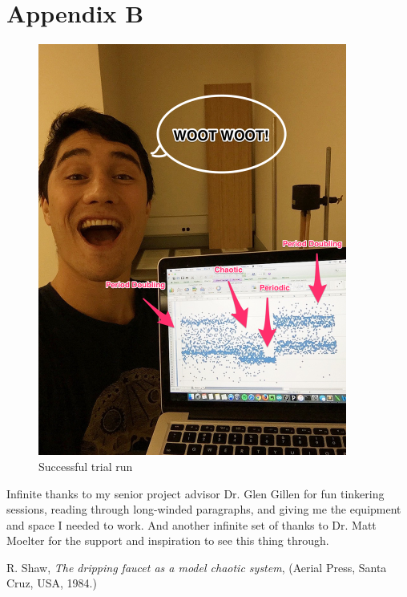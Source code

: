\documentclass[11pt]{article}
\begin{document}
\newpage
\section{\\Appendix B} \label{App:AppendixB}
\begin{figure}[htp]
\begin{center}
\includegraphics[width=4in]{figs/mushy}
\caption{Successful trial run}
\label{success}
\end{center}
\end{figure}
Infinite thanks to my senior project advisor Dr. Glen Gillen for fun tinkering sessions, reading through long-winded paragraphs, and giving me the equipment and space I needed to work. And another infinite set of thanks to Dr. Matt Moelter for the support and inspiration to see this thing through.
\newpage

\begin{thebibliography}{99}

R. Shaw, \textit{The dripping faucet as a model chaotic system},  (Aerial Press, Santa Cruz, USA, 1984.)

\end{thebibliography}

\end{document}

